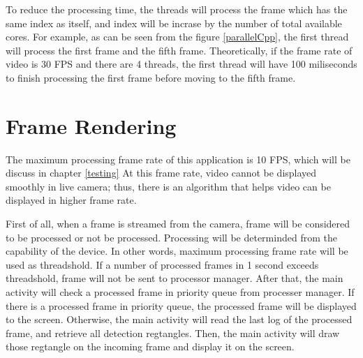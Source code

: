         To reduce the processing time,
        the threads will process the frame which has the same index as itself,
        and index will be incrase by the number of total available cores.
        For example, as can be seen from the figure \ref{parallelCpp},
        the first thread will process the first frame and the fifth frame.
        Theoretically, if the frame rate of video is 30 FPS and there are 4 threads,
        the first thread will have 100 miliseconds to finish processing the first frame before moving to the fifth frame.

    \section{Frame Rendering}
        The maximum processing frame rate of this application is 10 FPS, which will be discuss in chapter \ref{testing}
        At this frame rate, video cannot be displayed smoothly in live camera;
        thus, there is an algorithm that helps video can be displayed in higher frame rate.

        First of all, when a frame is streamed from the camera,
        frame will be considered to be processed or not be processed.
        Processing will be determinded from the capability of the device.
        In other words, maximum processing frame rate will be used as threadshold.
        If a number of processed frames in 1 second exceeds threadshold,
        frame will not be sent to processor manager.
        After that, the main activity will check a processed frame in priority queue from processer manager.
        If there is a processed frame in priority queue, the processed frame will be displayed to the screen.
        Otherwise, the main activity will read the last log of the processed frame, and retrieve all detection regtangles.
        Then, the main activity will draw those regtangle on the incoming frame and display it on the screen.
